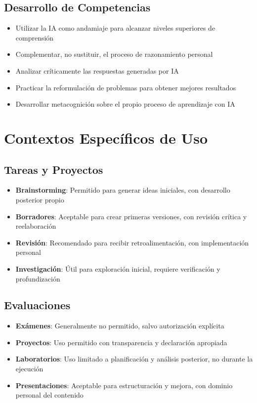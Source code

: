 \documentclass[11pt, letterpaper]{article}
\begin{document}
	\subsection{Desarrollo de Competencias}
	
	\begin{itemize}
		\item Utilizar la IA como andamiaje para alcanzar niveles superiores de comprensión
		\item Complementar, no sustituir, el proceso de razonamiento personal
		\item Analizar críticamente las respuestas generadas por IA
		\item Practicar la reformulación de problemas para obtener mejores resultados
		\item Desarrollar metacognición sobre el propio proceso de aprendizaje con IA
	\end{itemize}
	
	\section{Contextos Específicos de Uso}
	
	\subsection{Tareas y Proyectos}
	
	\begin{itemize}
		\item \textbf{Brainstorming}: Permitido para generar ideas iniciales, con desarrollo posterior propio
		\item \textbf{Borradores}: Aceptable para crear primeras versiones, con revisión crítica y reelaboración
		\item \textbf{Revisión}: Recomendado para recibir retroalimentación, con implementación personal
		\item \textbf{Investigación}: Útil para exploración inicial, requiere verificación y profundización
	\end{itemize}
	
	\subsection{Evaluaciones}
	
	\begin{itemize}
		\item \textbf{Exámenes}: Generalmente no permitido, salvo autorización explícita
		\item \textbf{Proyectos}: Uso permitido con transparencia y declaración apropiada
		\item \textbf{Laboratorios}: Uso limitado a planificación y análisis posterior, no durante la ejecución
		\item \textbf{Presentaciones}: Aceptable para estructuración y mejora, con dominio personal del contenido
	\end{itemize}
	
\end{document}
